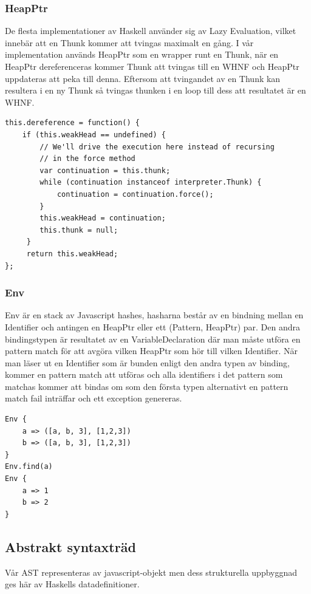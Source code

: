 \subsubsection{HeapPtr}
De flesta implementationer av Haskell använder sig av Lazy Evaluation, vilket innebär att en Thunk kommer att tvingas maximalt en gång. I vår implementation används HeapPtr som en wrapper runt en Thunk, när en HeapPtr dereferenceras kommer Thunk att tvingas till en WHNF och HeapPtr uppdateras att peka till denna. Eftersom att tvingandet av en Thunk kan resultera i en ny Thunk så tvingas thunken i en loop till dess att resultatet är en WHNF.

\begin{lstlisting}
this.dereference = function() {
    if (this.weakHead == undefined) {
        // We'll drive the execution here instead of recursing 
        // in the force method
        var continuation = this.thunk;
        while (continuation instanceof interpreter.Thunk) {
            continuation = continuation.force();
        }
        this.weakHead = continuation;
        this.thunk = null;
     }
     return this.weakHead;
};
\end{lstlisting}

\subsubsection{Env}
Env är en stack av Javascript hashes, hasharna består av en bindning mellan en Identifier och antingen en HeapPtr eller ett (Pattern, HeapPtr) par.  Den andra bindingstypen är resultatet av en VariableDeclaration där man måste utföra en pattern match för att avgöra vilken HeapPtr som hör till vilken Identifier. När man läser ut en Identifier som är bunden enligt den andra typen av binding,  kommer en pattern match att utföras och alla identifiers i det pattern som matchas kommer att bindas om som den första typen alternativt en pattern match fail inträffar och ett exception genereras.

\begin{lstlisting}
Env {
    a => ([a, b, 3], [1,2,3])
    b => ([a, b, 3], [1,2,3])
}
Env.find(a)
Env {
    a => 1
    b => 2
}
\end{lstlisting}

\subsection{Abstrakt syntaxträd} 
Vår AST representeras av javascript-objekt men dess strukturella uppbyggnad ges här av Haskells datadefinitioner.

